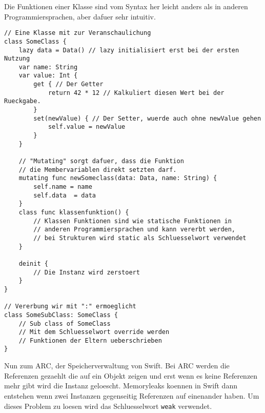 Die Funktionen einer Klasse sind vom Syntax her leicht anders als in anderen Programmiersprachen, aber dafuer sehr intuitiv. 
\begin{lstlisting}
// Eine Klasse mit zur Veranschaulichung 
class SomeClass {
	lazy data = Data() // lazy initialisiert erst bei der ersten Nutzung
	var name: String
	var value: Int {
		get { // Der Getter
			return 42 * 12 // Kalkuliert diesen Wert bei der Rueckgabe.
		}
		set(newValue) { // Der Setter, wuerde auch ohne newValue gehen
			self.value = newValue
		}	
	} 

	// "Mutating" sorgt dafuer, dass die Funktion 
	// die Membervariablen direkt setzten darf.
	mutating func newSomeclass(data: Data, name: String) {
		self.name = name
		self.data  = data
	}
	class func klassenfunktion() {
		// Klassen Funktionen sind wie statische Funktionen in 
		// anderen Programmiersprachen und kann vererbt werden, 
		// bei Strukturen wird static als Schluesselwort verwendet
	}

	deinit {
		// Die Instanz wird zerstoert
	}
}

// Vererbung wir mit ":" ermoeglicht
class SomeSubClass: SomeClass {
	// Sub class of SomeClass
	// Mit dem Schluesselwort override werden 
	// Funktionen der Eltern ueberschrieben
}
\end{lstlisting}
Nun zum ARC, der Speicherverwaltung von Swift. Bei ARC werden die Referenzen gezaehlt die auf ein Objekt zeigen und erst wenn es keine Referenzen mehr gibt wird die Instanz geloescht. Memoryleaks koennen in Swift dann entstehen wenn zwei Instanzen gegenseitig Referenzen auf einenander haben. Um dieses Problem zu loesen wird das Schluesselwort \lstinline{weak} verwendet.
